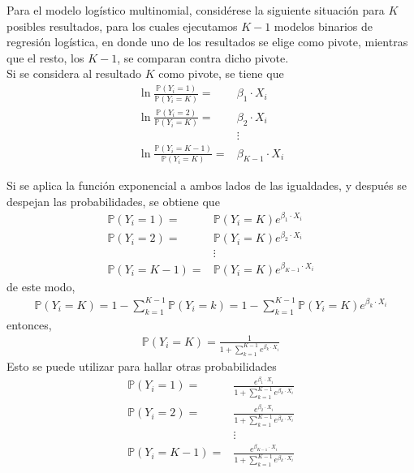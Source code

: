 \documentclass{article}
\theoremstyle{remark}
\begin{document}
Para el modelo logístico multinomial, considérese la siguiente situación para \(K\) posibles resultados, para los cuales ejecutamos \(K-1\) modelos binarios de regresión logística, en donde uno de los resultados se elige como pivote, mientras que el resto, los \(K-1\), se comparan contra dicho pivote.\\

Si se considera al resultado \(K\) como pivote, se tiene que 
\begin{align*}
    \ln \frac{\mathbb{P}(Y_i=1)}{\mathbb{P}(Y_i=K)}=& \beta_1\cdot X_i\\
    \ln \frac{\mathbb{P}(Y_i=2)}{\mathbb{P}(Y_i=K)}=& \beta_2\cdot X_i\\
    & \vdots\\
    \ln \frac{\mathbb{P}(Y_i=K-1)}{\mathbb{P}(Y_i=K)}=& \beta_{K-1}\cdot X_i
\end{align*}

Si se aplica la función exponencial a ambos lados de las igualdades, y después se despejan las probabilidades, se obtiene que 
\begin{align*}
    \mathbb{P}(Y_i=1)=&\mathbb{P}(Y_i=K)e^{\beta_1\cdot X_i}\\
    \mathbb{P}(Y_i=2)=&\mathbb{P}(Y_i=K)e^{\beta_2\cdot X_i}\\
    & \vdots\\
    \mathbb{P}(Y_i=K-1)=&\mathbb{P}(Y_i=K)e^{\beta_{K-1}\cdot X_i}
\end{align*}
de este modo,
\begin{align*}
    \mathbb{P}(Y_i=K)= 1-\sum_{k=1}^{K-1}\mathbb{P}(Y_i=k)=1-\sum_{k=1}^{K-1}\mathbb{P}(Y_i=K)e^{\beta_k\cdot X_i}
\end{align*}
entonces,
\begin{align*}
    \mathbb{P}(Y_i=K)=\frac{1}{1+\sum_{k=1}^{K-1}e^{\beta_k\cdot X_i}}
\end{align*}
Esto se puede utilizar para hallar otras probabilidades 
\begin{align*}
    \mathbb{P}(Y_i=1)=&\frac{e^{\beta_{1}\cdot X_i}}{1+\sum_{k=1}^{K-1}e^{\beta_k\cdot X_i}}\\
    \mathbb{P}(Y_i=2)=&\frac{e^{\beta_{2}\cdot X_i}}{1+\sum_{k=1}^{K-1}e^{\beta_k\cdot X_i}}\\
    &\vdots\\
    \mathbb{P}(Y_i=K-1)=&\frac{e^{\beta_{K-1}\cdot X_i}}{1+\sum_{k=1}^{K-1}e^{\beta_k\cdot X_i}}
\end{align*}
\end{document}
